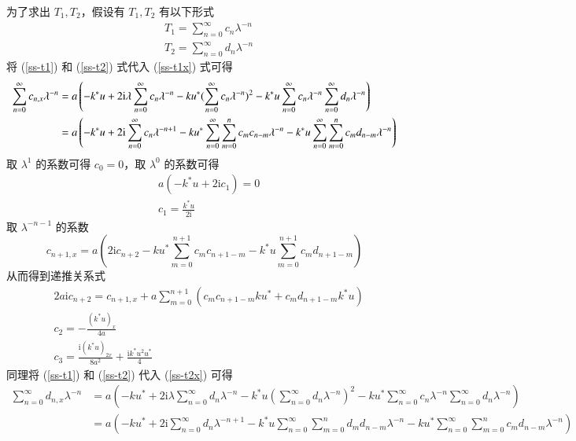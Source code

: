 为了求出 $T_1, T_2$，假设有 $T_{1}, T_{2}$ 有以下形式
\begin{align}
  & T_{1} = \sum_{n=0}^{\infty}c_{n}\lambda^{-n} \label{ss-t1}\\
  & T_{2} = \sum_{n=0}^{\infty}d_{n}\lambda^{-n} \label{ss-t2}
\end{align}
将 (\ref{ss-t1}) 和 (\ref{ss-t2}) 式代入  (\ref{ss-t1x}) 式可得
\begin{align}
  \sum_{n=0}^{\infty}c_{n,x}\lambda^{-n} &= a\left(-k^{*}u + 2\mathrm{i}\lambda\sum_{n=0}^{\infty}c_{n}\lambda^{-n} - ku^{*}(\sum_{n=0}^{\infty}c_{n}\lambda^{-n})^{2} - k^{*}u\sum_{n=0}^{\infty}c_{n}\lambda^{-n}\sum_{n=0}^{\infty}d_{n}\lambda^{-n}\right) \notag\\
  &= a\left(-k^{*}u + 2\mathrm{i}\sum_{n=0}^{\infty}c_{n}\lambda^{-n+1} - ku^{*}\sum_{n=0}^{\infty}\sum_{m=0}^{n}c_{m}c_{n-m}\lambda^{-n} - k^{*}u\sum_{n=0}^{\infty}\sum_{m=0}^{n}c_{m}d_{n-m}\lambda^{-n}\right)
\end{align}
取 $\lambda^{1}$ 的系数可得 $c_{0} = 0$，取 $\lambda^{0}$ 的系数可得
\begin{align}
  & a(-k^{*}u + 2\mathrm{i}c_{1}) = 0 \\
  & c_{1} = \frac{k^{*}u}{2\mathrm{i}}
\end{align}
取 $\lambda^{-n-1}$ 的系数
\begin{equation}
  c_{n+1,x} = a\left(2\mathrm{i}c_{n+2} - ku^{*}\sum_{m=0}^{n+1}c_{m}c_{n+1-m} - k^{*}u\sum_{m=0}^{n+1}c_{m}d_{n+1-m}\right)
\end{equation}
从而得到递推关系式
\begin{align}
  & 2a\mathrm{i}c_{n+2} = c_{n+1,x} + a\sum_{m=0}^{n+1}(c_{m}c_{n+1-m}ku^{*} + c_{m}d_{n+1-m}k^{*}u) \\
  & c_{2} = -\frac{(k^{*}u)_{x}}{4a} \\
  & c_{3} = \frac{\mathrm{i}(k^{*}u)_{2x}}{8a^{2}} + \frac{\mathrm{i}k^{*}u^{2}u^{*}}{4}
\end{align}
同理将 (\ref{ss-t1}) 和 (\ref{ss-t2}) 代入 (\ref{ss-t2x}) 可得
\begin{align}
\sum_{n=0}^{\infty}d_{n,x}\lambda^{-n} &=a\left(-ku^*+2\mathrm{i}\lambda \sum_{n=0}^{\infty}d_n\lambda^{-n}-k^*u(\sum_{n=0}^{\infty}d_n\lambda^{-n})^2-ku^*\sum_{n=0}^{\infty}c_n\lambda^{-n}\sum_{n=0}^{\infty}d_n\lambda^{-n}\right)\nonumber\\
	&=a\left(-ku^*+2\mathrm{i} \sum_{n=0}^{\infty}d_n\lambda^{-n+1}-k^*u\sum_{n=0}^{\infty}\sum_{m=0}^{n}d_md_{n-m}\lambda^{-n}-ku^*\sum_{n=0}^{\infty}\sum_{m=0}^{n}c_md_{n-m}\lambda^{-n}\right)\nonumber
\end{align}
